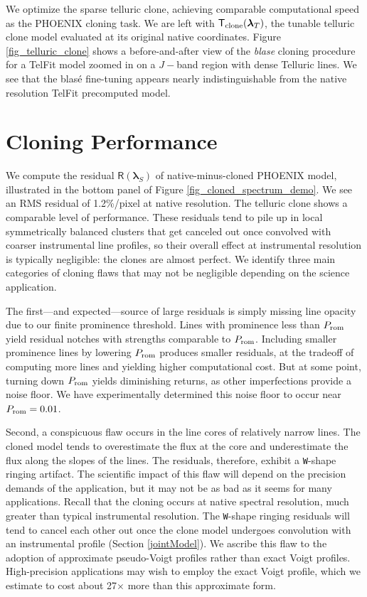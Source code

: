 \documentclass[twocolumn]{aastex631}
\begin{document}
We optimize the sparse telluric clone, achieving comparable computational speed as the PHOENIX cloning task.  We are left with $\mathsf{T}_{\rm clone}(\bm{\lambda}_T)$, the tunable telluric clone model evaluated at its original native coordinates.  Figure \ref{fig_telluric_clone} shows a before-and-after view of the  \emph{blase} cloning procedure for a TelFit model zoomed in on a $J-$band region with dense Telluric lines.  We see that the blas\'e fine-tuning appears nearly indistinguishable from the native resolution TelFit precomputed model.



\section{Cloning Performance}

We compute the residual $\mathsf{R}(\bm{\lambda}_S)$ of native-minus-cloned PHOENIX model, illustrated in the bottom panel of Figure \ref{fig_cloned_spectrum_demo}. We see an RMS residual of 1.2\%/pixel at native resolution.  The telluric clone shows a comparable level of performance.  These residuals tend to pile up in local symmetrically balanced clusters that get canceled out once convolved with coarser instrumental line profiles, so their overall effect at instrumental resolution is typically negligible: the clones are almost perfect.  We identify three main categories of cloning flaws that may not be negligible depending on the science application.

The first---and expected---source of large residuals is simply missing line opacity due to our finite prominence threshold. Lines with prominence less than $P_{\rm rom}$ yield residual notches with strengths comparable to $P_{\rm rom}$. Including smaller prominence lines by lowering $P_{\rm rom}$ produces smaller residuals, at the tradeoff of computing more lines and yielding higher computational cost.  But at some point, turning down $P_{\rm rom}$ yields diminishing returns, as other imperfections provide a noise floor.  We have experimentally determined this noise floor to occur near $P_{\rm rom}=0.01$.

Second, a conspicuous flaw occurs in the line cores of relatively narrow lines.  The cloned model tends to overestimate the flux at the core and underestimate the flux along the slopes of the lines.  The residuals, therefore, exhibit a \texttt{W}-shape ringing artifact.  The scientific impact of this flaw will depend on the precision demands of the application, but it may not be as bad as it seems for many applications.  Recall that the cloning occurs at native spectral resolution, much greater than typical instrumental resolution.  The \texttt{W}-shape ringing residuals will tend to cancel each other out once the clone model undergoes convolution with an instrumental profile (Section \ref{jointModel}).  We ascribe this flaw to the adoption of approximate pseudo-Voigt profiles rather than exact Voigt profiles.  High-precision applications may wish to employ the exact Voigt profile, which we estimate to cost about 27$\times$ more than this approximate form.
\end{document}
